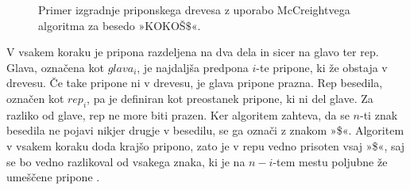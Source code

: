 \begin{figure}[htb]
    \begin{subfigure}[t]{0.3\linewidth}
        \subcaption*{}
        
        \centering
        \label{fig:McCreigov1}
    \end{subfigure}
    \hspace{0.5cm}
    \begin{subfigure}[t]{0.3\linewidth}
        \subcaption*{}
        
        \centering
        \label{fig:McCreigov2}
    \end{subfigure}
    \hspace{0.5cm}
    \begin{subfigure}[t]{0.3\linewidth}
        \subcaption*{}
        
        \centering
        \label{fig:McCreigov3}
    \end{subfigure}
    
    \begin{subfigure}[t]{0.3\linewidth}
        \subcaption*{}
        
        \centering
        \label{fig:McCreigov4}
    \end{subfigure}
    \hspace{0.5cm}
    \begin{subfigure}[t]{0.3\linewidth}
        \subcaption*{}
        
        \centering
        \label{fig:McCreigov5}
    \end{subfigure}
    \hspace{0.5cm}
    \begin{subfigure}[t]{0.3\textwidth}
        \subcaption*{}
        
        \centering
        \label{fig:McCreigov6}
    \end{subfigure}
        \caption{Primer izgradnje priponskega drevesa z uporabo McCreightvega algoritma za besedo »KOKOŠ$\$$«.} 
        \label{fig:McCreight}
\end{figure}

V vsakem koraku je pripona razdeljena na dva dela in sicer na glavo ter rep. Glava, označena kot $glava_i$, je najdaljša predpona $i$-te pripone, ki že obstaja v drevesu. Če take pripone ni v drevesu, je glava pripone prazna. Rep besedila, označen kot $rep_i$, pa je definiran kot preostanek pripone, ki ni del glave. Za razliko od glave, rep ne more biti prazen. Ker algoritem zahteva, da se $n$-ti znak besedila ne pojavi nikjer drugje v besedilu, se ga označi z znakom »\$«. Algoritem v vsakem koraku doda krajšo pripono, zato je v repu vedno prisoten vsaj »\$«, saj se bo vedno razlikoval od vsakega znaka, ki je na $n-i$-tem mestu poljubne že umeščene pripone \cite{McCreight1976}.

